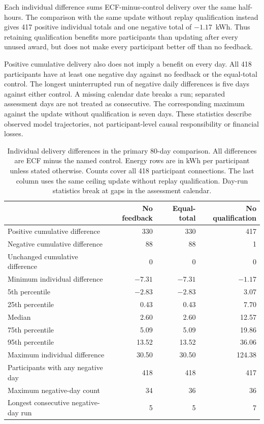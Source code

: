 \documentclass[11pt]{article}
\begin{document}
Each individual difference sums ECF-minus-control delivery over the same
half-hours. The comparison with the same update without replay qualification
instead gives 417 positive individual totals and one negative total of
$-1.17$~kWh. Thus retaining qualification benefits more participants than
updating after every unused award, but does not make every participant
better off than no feedback.

Positive cumulative delivery also does not imply a benefit on every day.
All 418 participants have at least one negative day against no feedback or
the equal-total control. The longest uninterrupted run of negative daily
differences is five days against either control. A missing calendar date
breaks a run; separated assessment days are not treated as consecutive.
The corresponding maximum against the update without qualification is
seven days. These statistics describe observed model trajectories, not
participant-level causal responsibility or financial losses.

\begin{table}[!htbp]
\centering
\caption{Individual delivery differences in the primary 80-day comparison.
All differences are ECF minus the named control. Energy rows are in kWh per
participant unless stated otherwise. Counts cover all 418 participant
connections. The last column uses the same ceiling update without replay
qualification. Day-run statistics break at gaps in the assessment calendar.}
\label{tab:supp_individual_delivery}
\small
\begin{tabular}{@{}p{6.0cm}rrr@{}}
\toprule
 & No feedback & Equal-total & No qualification \\
\midrule
Positive cumulative difference & 330 & 330 & 417 \\
Negative cumulative difference & 88 & 88 & 1 \\
Unchanged cumulative difference & 0 & 0 & 0 \\
Minimum individual difference & $-7.31$ & $-7.31$ & $-1.17$ \\
5th percentile & $-2.83$ & $-2.83$ & 3.07 \\
25th percentile & 0.43 & 0.43 & 7.70 \\
Median & 2.60 & 2.60 & 12.57 \\
75th percentile & 5.09 & 5.09 & 19.86 \\
95th percentile & 13.52 & 13.52 & 36.06 \\
Maximum individual difference & 30.50 & 30.50 & 124.38 \\
Participants with any negative day & 418 & 418 & 417 \\
Maximum negative-day count & 34 & 36 & 36 \\
Longest consecutive negative-day run & 5 & 5 & 7 \\
\bottomrule
\end{tabular}
\end{table}
\end{document}
